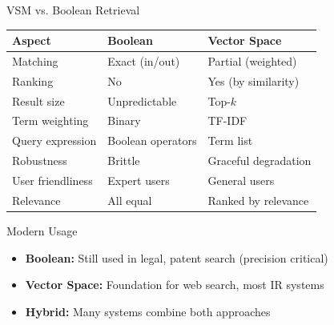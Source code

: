 \documentclass[aspectratio=169]{beamer}
\newif\ifanimated
\newcommand{\cpause}{\ifanimated\pause\fi}
\begin{document}
\begin{frame}{VSM vs. Boolean Retrieval}
\begin{table}
\centering
\small
\begin{tabular}{lll}
\toprule
\textbf{Aspect} & \textbf{Boolean} & \textbf{Vector Space} \\
\midrule
Matching & Exact (in/out) & Partial (weighted) \\
Ranking & No & Yes (by similarity) \\
Result size & Unpredictable & Top-$k$ \\
Term weighting & Binary & TF-IDF \\
Query expression & Boolean operators & Term list \\
Robustness & Brittle & Graceful degradation \\
User friendliness & Expert users & General users \\
Relevance & All equal & Ranked by relevance \\
\bottomrule
\end{tabular}
\end{table}

\vspace{1em}

\begin{block}{Modern Usage}
\begin{itemize}
    \item \textbf{Boolean:} Still used in legal, patent search (precision critical)
    \item \textbf{Vector Space:} Foundation for web search, most IR systems
    \item \textbf{Hybrid:} Many systems combine both approaches
\end{itemize}
\cpause
\end{block}
\cpause
\end{frame}
\end{document}
